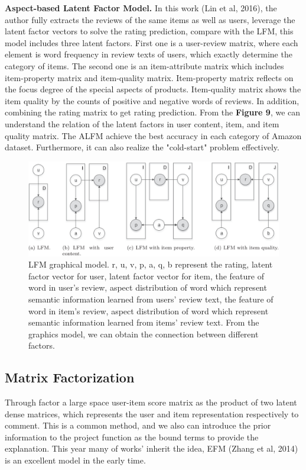 \documentclass[10pt,twocolumn,letterpaper]{article}
\begin{document}
{\bf Aspect-based Latent Factor Model.} In this work (Lin et al, 2016), the author fully extracts the reviews of the same items as well as users, leverage the latent factor vectors to solve the rating prediction, compare with the LFM, this model includes three latent factors. First one is a user-review matrix, where each element is word frequency in review texts of users, which exactly determine the category of items. The second one is an item-attribute matrix which includes item-property matrix and item-quality matrix. Item-property matrix reflects on the focus degree of the special aspects of products. Item-quality matrix shows the item quality by the counts of positive and negative words of reviews. In addition, combining the rating matrix to get rating prediction. From the {\bf Figure 9}, we can understand the relation of the latent factors in user content, item, and item quality matrix. The ALFM achieve the best accuracy in each category of Amazon dataset. Furthermore, it can also realize the "cold-start" problem effectively.
\begin{figure}
	\begin{center}
		\includegraphics[width=.9\linewidth]{LFM.png}
	\end{center}
	\caption{LFM graphical model. r, u, v, p, a, q, b represent the rating, latent factor vector for user, latent factor vector for item, the feature of word in user's review, aspect distribution of word which represent semantic information learned from users’ review text, the feature of word in item's review, aspect distribution of word which represent semantic information learned from items’ review text. From the graphics model, we can obtain the connection between different factors.}
	\label{fig:short}
\end{figure}

\subsection{Matrix Factorization}
Through factor a large space user-item score matrix as the product of two latent dense matrices, which represents the user and item representation respectively to comment. This is a common method, and we also can introduce the prior information to the project function as the bound terms to provide the explanation. This year many of works' inherit the idea, EFM (Zhang et al, 2014) is an excellent model in the early time. 
\end{document}

